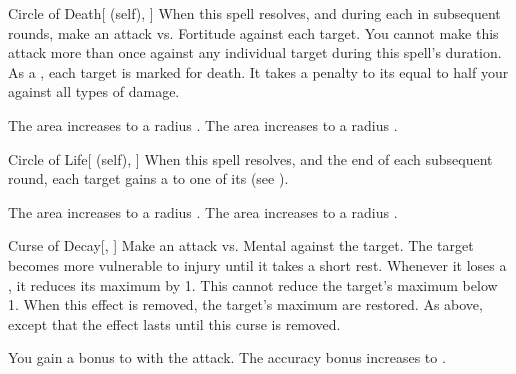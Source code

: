\lowercase{\hypertarget{spell:Circle of Death}{}}\label{spell:Circle of Death}
\begin{attuneability}[Rank 3]{\hypertarget{spell:Circle of Death}{Circle of Death}}[ (self), ]
When this spell resolves, and during each  in subsequent rounds, make an attack vs. Fortitude against each target.
You cannot make this attack more than once against any individual target during this spell's duration.
\hit As a , each target is marked for death.
It takes a penalty to its  equal to half your  against all types of damage.

\rankline
{} The area increases to a \arealarge radius .
 The area increases to a \areahuge radius .
\end{attuneability}
\vspace{0.25em}



\lowercase{\hypertarget{spell:Circle of Life}{}}\label{spell:Circle of Life}
\begin{attuneability}[Rank 3]{\hypertarget{spell:Circle of Life}{Circle of Life}}[ (self), ]
When this spell resolves, and the end of each subsequent round, each target gains a   to one of its  (see ).

\rankline
{} The area increases to a \arealarge radius .
 The area increases to a \areahuge radius .
\end{attuneability}
\vspace{0.25em}



\lowercase{\hypertarget{spell:Curse of Decay}{}}\label{spell:Curse of Decay}
\begin{freeability}[Rank 3]{\hypertarget{spell:Curse of Decay}{Curse of Decay}}[, ]
Make an attack vs. Mental against the target.
\hit The target becomes more vulnerable to injury until it takes a short rest.
Whenever it loses a , it reduces its maximum  by 1.
This cannot reduce the target's maximum  below 1.
When this effect is removed, the target's maximum  are restored.
\crit As above, except that the effect lasts until this curse is removed.

\rankline
{} You gain a  bonus to  with the attack.
 The accuracy bonus increases to .
\end{freeability}
\vspace{0.25em}



